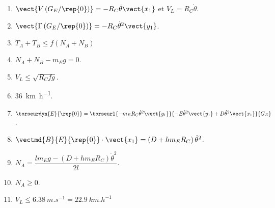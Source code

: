 \begin{multicols}{2}
\ifprof
\else

\ifnormal
\ifcolle
\else
\footnotesize
\begin{enumerate}
\item $\vect{V\left(G_E /\rep{0}\right)}=-R_C\dot{\theta}\vect{x_1}$ et $V_L=R_C\dot{\theta}$.
\item $\vect{\Gamma \left(G_E /\rep{0}\right)}=-R_C\dot{\theta}^2\vect{y_1}$.
\item $T_A+T_B\leq f\left(N_A+N_B\right)$
\item $N_A+N_B-m_E g = 0$. 
\item $V_L \leq \sqrt{R_Cfg}$.
\item \SI{36}{km.h^{-1}}.
\item $\torseurdyn{E}{\rep{0}}=\torseurl{-m_E R_C\dot{\theta}^2\vect{y_1}}{-E\dot{\theta}^2\vect{y_1}+D\dot{\theta}^2\vect{x_1}}{G_E}$.
\item $\vectmd{B}{E}{\rep{0}}\cdot \vect{x_1}=\left(D+ h m_E R_C\right)\dot{\theta}^2$.
\item $ N_A=\dfrac{ l  m_E g-\left(D+ h m_E R_C\right)\dot{\theta}^2}{2l}$.
\item $N_A\geq0$.
\item  $V_L  \leq \SI{6,38}{m.s^{-1}}=\SI{22,9}{km.h^{-1}}$
\end{enumerate}
\normalsize
\fi
\else
\fi

\fi

\ifprof
\else
\end{multicols}
\fi


